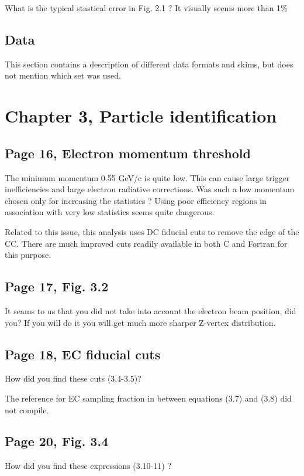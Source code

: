 \documentclass[11pt]{paper}
\begin{document}
What is the typical stastical error in Fig. 2.1 ?
It visually seems more than 1\%

\subsection*{Data}

This section contains a description of different data formats and skims, but does not mention which set was used.

\section*{Chapter 3, Particle identification}
 \subsection*{Page 16, Electron momentum threshold}
The minimum momentum 0.55 GeV/c is quite low.
This can cause large trigger inefficiencies and large electron radiative corrections.
Was such a low momentum chosen only for increasing the statistics ?
Using poor efficiency regions in association with very low statistics seems quite dangerous.

Related to this issue, this analysis uses DC fiducial cuts to remove the edge of the CC.
There are much improved cuts readily available in both C and Fortran for this purpose. 


\subsection*{Page 17, Fig. 3.2} It seams to us that you did not take into account the electron beam position, did you?
If you will do it you will get much more sharper Z-vertex distribution.

 \subsection*{Page 18, EC fiducial cuts}
 
 How did you find these cuts (3.4-3.5)? 

The reference for EC sampling fraction in between equations (3.7) and (3.8) did not compile.

\subsection*{Page 20, Fig. 3.4}
How did you find these expressions (3.10-11) ?
\end{document}

